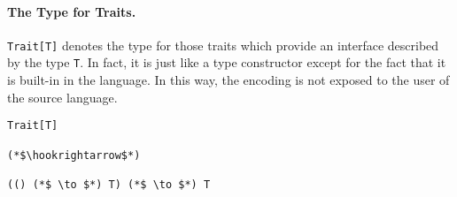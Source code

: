 \paragraph{The Type for Traits.} \lstinline$Trait[T]$ denotes the type for those
traits which provide an interface described by the type \lstinline$T$. In fact,
it is just like a type constructor except for the fact that it is built-in in
the language. In this way, the encoding is not exposed to the user of the source
language.

\begin{lstlisting}
Trait[T]

(*$\hookrightarrow$*)

(() (*$ \to $*) T) (*$ \to $*) T
\end{lstlisting}
